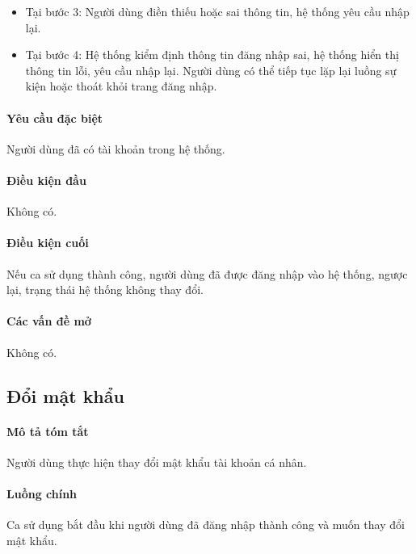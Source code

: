 \documentclass[./../main.tex]{subfiles}
\begin{document}
\begin{itemize}
	\item
	      	Tại bước 3: Người dùng điền thiếu hoặc sai thông tin, hệ thống yêu cầu
	      	nhập lại.
	\item
	      	Tại bước 4: Hệ thống kiểm định thông tin đăng nhập sai, hệ thống hiển
	      	thị thông tin lỗi, yêu cầu nhập lại. Người dùng có thể tiếp tục lặp
	      	lại luồng sự kiện hoặc thoát khỏi trang đăng nhập.
\end{itemize}

\paragraph*{Yêu cầu đặc biệt}

Người dùng đã có tài khoản trong hệ thống.

\paragraph*{Điều kiện đầu}

Không có.

\paragraph*{Điều kiện cuối}

Nếu ca sử dụng thành công, người dùng đã được đăng nhập vào hệ thống,
ngược lại, trạng thái hệ thống không thay đổi.

\paragraph*{Các vấn đề mở}

Không có.

\subsection{Đổi mật khẩu}

\paragraph*{Mô tả tóm tắt}

Người dùng thực hiện thay đổi mật khẩu tài khoản cá nhân.


\paragraph*{Luồng chính} Ca sử dụng bắt đầu khi người dùng đã đăng nhập thành
công và muốn thay đổi mật khẩu.
\end{document}
